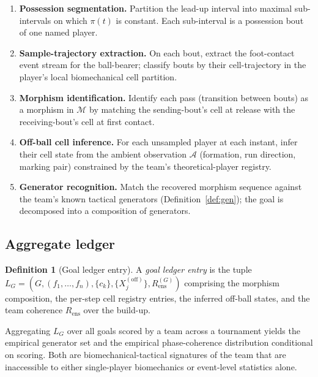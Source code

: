 \documentclass[11pt,twocolumn,a4paper]{article}
\theoremstyle{definition}
\newtheorem{definition}[theorem]{Definition}
\theoremstyle{remark}
\newcommand{\Rens}{R_{\mathrm{ens}}}
\newcommand{\Mcal}{\mathcal{M}}
\newcommand{\Acal}{\mathcal{A}}
\begin{document}
\begin{enumerate}[leftmargin=1.4em]
  \item \textbf{Possession segmentation.} Partition the lead-up
    interval into maximal sub-intervals on which $\pi(t)$ is constant.
    Each sub-interval is a possession bout of one named player.
  \item \textbf{Sample-trajectory extraction.} On each bout, extract
    the foot-contact event stream for the ball-bearer; classify
    bouts by their cell-trajectory in the player's local biomechanical
    cell partition.
  \item \textbf{Morphism identification.} Identify each pass (transition
    between bouts) as a morphism in $\Mcal$ by matching the
    sending-bout's cell at release with the receiving-bout's cell at
    first contact.
  \item \textbf{Off-ball cell inference.} For each unsampled player at
    each instant, infer their cell state from the ambient
    observation $\Acal$ (formation, run direction, marking pair)
    constrained by the team's theoretical-player registry.
  \item \textbf{Generator recognition.} Match the recovered morphism
    sequence against the team's known tactical generators
    (Definition~\ref{def:gen}); the goal is decomposed into a
    composition of generators.
\end{enumerate}

\subsection{Aggregate ledger}

\begin{definition}[Goal ledger entry]
\label{def:ledger}
A \emph{goal ledger entry} is the tuple
$L_G = (G, (f_1,\ldots,f_n), \{c_k\}, \{X_j^{(\mathrm{off})}\}, \Rens^{(G)})$
comprising the morphism composition, the per-step cell registry
entries, the inferred off-ball states, and the team coherence
$\Rens$ over the build-up.
\end{definition}

Aggregating $L_G$ over all goals scored by a team across a tournament
yields the empirical generator set and the empirical
phase-coherence distribution conditional on scoring. Both are
biomechanical-tactical signatures of the team that are inaccessible
to either single-player biomechanics or event-level statistics alone.
\end{document}
